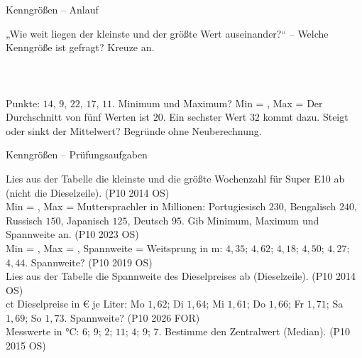\begin{aufgabe}{Kenngrößen – Anlauf}
\begin{teile}
\teil „Wie weit liegen der kleinste und der größte Wert auseinander?“ – Welche Kenngröße ist gefragt? Kreuze an.\\  \\  \\  \\ 
\teil Punkte: $14$, $9$, $22$, $17$, $11$. Minimum und Maximum? Min = \leerfeld , Max = \leerfeld
\teil Der Durchschnitt von fünf Werten ist $20$. Ein sechster Wert $32$ kommt dazu. Steigt oder sinkt der Mittelwert? Begründe ohne Neuberechnung.
\end{teile}
\end{aufgabe}

\begin{aufgabe}{Kenngrößen – Prüfungsaufgaben}
\begin{teile}
\teil Lies aus der Tabelle die kleinste und die größte Wochenzahl für Super E10 ab (nicht die Dieselzeile). \hfill (P10 2014 OS) \\

Min = \leerfeld , Max = \leerfeld
\teil Muttersprachler in Millionen: Portugiesisch $230$, Bengalisch $240$, Russisch $150$, Japanisch $125$, Deutsch $95$. Gib Minimum, Maximum und Spannweite an. \hfill (P10 2023 OS) \\ Min = \leerfeld , Max = \leerfeld , Spannweite = \leerfeld
\teil Weitsprung in m: $4{,}35$; $4{,}62$; $4{,}18$; $4{,}50$; $4{,}27$; $4{,}44$. Spannweite? \hfill (P10 2019 OS) \\ \leerfeld[m]
\teil Lies aus der Tabelle die Spannweite des Dieselpreises ab (Dieselzeile). \hfill (P10 2014 OS) \\

\leerfeld ct
\teil Dieselpreise in € je Liter: Mo $1{,}62$; Di $1{,}64$; Mi $1{,}61$; Do $1{,}66$; Fr $1{,}71$; Sa $1{,}69$; So $1{,}73$. Spannweite? \hfill (P10 2026 FOR) \\ \leerfeld[€]
\teil Messwerte in °C: $6$; $9$; $2$; $11$; $4$; $9$; $7$. Bestimme den Zentralwert (Median). \hfill (P10 2015 OS)
\end{teile}
\end{aufgabe}

